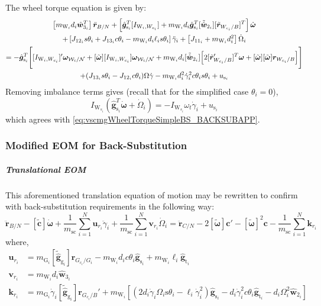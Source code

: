 The wheel torque equation is given by:
\begin{multline}
		\left[ m_{\text{W}_i}d_i\hat{\bm w}_{3_i}^T \right] \ddot{\bm r}_{B/N} + \left[ \hat{\bm g}_{\text{s}_i}^T[I_{\text{W}_i,W_{c_i}}] + m_{\text{W}_i}d_i\hat{\bm g}_{\text{s}_i}^T[\tilde{\hat{\bm w}}_{2_i}][\tilde{\bm{r}}_{W_{c_i}/B}]^T \right] \dot{\bm\omega}
		\\
		+\left[ J_{12_i}s\theta_i + J_{13_i}c\theta_i - m_{\text{W}_i}d_i\ell_is\theta_i \right] \ddot{\gamma}_i 
		+ \left[ J_{11_i}  + m_{\text{W}_i}d_i^2 \right] \dot{\Omega}_i
		\\
		=-\hat{\bm g}_{\text{s}_i}^T \Bigg[ [I_{\text{W}_i,W_{c_i}}]'\bm\omega_{\mathcal{W}_i/\cal N} + [\tilde{\bm{\omega}}][I_{\text{W}_i,W_{c_i}}]\bm\omega_{\mathcal{W}_i/\cal N}  + m_{\text{W}_i}d_i[\tilde{\hat{\bm w}}_{2_i}] \Big[ 2[\tilde{\bm{r}}'_{W_{c_i}/B}]^T\bm\omega + [\tilde{\bm\omega}][\tilde{\bm\omega}]\bm{r}_{W_{c_i}/B}
		\Big] \Bigg] \\+(J_{13_i}s\theta_i - J_{12_i}c\theta_i)\Omega\dot{\gamma} - m_{\text{W}_i}d_i^2\dot{\gamma}_i^2c\theta_is\theta_i
		+ u_{\text{s}_i}
\end{multline}  
Removing imbalance terms gives (recall that for the simplified case $\theta_i = 0$),
\begin{equation}
	I_{\text{W}_{s_i}}(\hat{\bm g}_{\text{s}_i}^T\dot{\bm\omega} + \dot{\Omega}_i)
	=-I_{\text{W}_{s_i}}\omega_t\dot{\gamma}_i + u_{\text{s}_i}
\end{equation} 
which agrees with \eqref{eq:vscmgWheelTorqueSimpleBS_BACKSUBAPP}.

\subsubsection{Modified EOM for Back-Substitution}

\subparagraph{Translational EOM}

This aforementioned translation equation of motion may be rewritten to confirm with back-substitution requirements in the following way:
\begin{equation}
\ddot{\bm r}_{B/N} - [\tilde{\bm{c}}]\dot{\bm \omega} + \frac{1}{m_{\text{sc}}} \sum\limits_{i=1}^{N}\bm{u}_{r_i}\ddot{\gamma}_i + \frac{1}{m_{\text{sc}}} \sum\limits_{i=1}^{N}\bm{v}_{r_i}\dot{\Omega}_i = \ddot{\bm r}_{C/N} - 2[\tilde{\bm{\omega}}]\bm{c}' - [\tilde{\bm{\omega}}]^2\bm{c} - \frac{1}{m_{\text{sc}}} \sum\limits_{i=1}^{N}\bm{k}_{r_i}
\label{eq:transabbr}
\end{equation}
where,
\begin{align}
\bm{u}_{r_i} &= m_{\text{G}_i}[\tilde{\hat{\bm g}}_{\text{g}_i}] \bm{r}_{G_{c_i}/G_i} - m_{\text{W}_i}d_ic\theta_i\hat{\bm{g}}_{\text{s}_i} + m_{\text{W}_i}\ell_i\hat{\bm{g}}_{\text{t}_i}
\\
\bm{v}_{r_i} &= m_{\text{W}_i}d_i\hat{\bm w}_{3_i}
\\
\bm{k}_{r_i} &= m_{\text{G}_i}\dot{\gamma}_i[\tilde{\hat{\bm g}}_{\text{g}_i}] \bm{r}_{G_{c_i}/B}'
+ m_{\text{W}_i} \left[ \left(2d_i\dot{\gamma}_i\Omega_i\text{s}\theta_i - \ell_i\dot{\gamma}_i^2\right)\hat{\bm{g}}_{\text{s}_i} - d_i\dot{\gamma}_i^2c\theta_i\hat{\bm{g}}_{\text{t}_i} - d_i\Omega_i^2 \hat{\bm{w}}_{2_i} \right]
\end{align}

